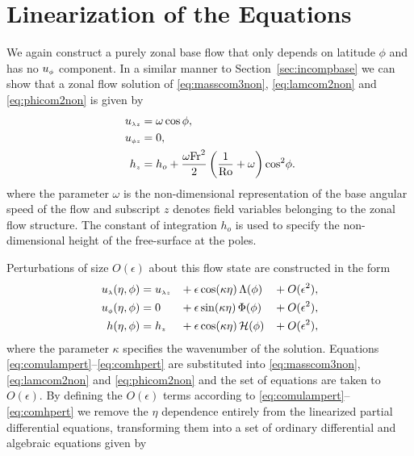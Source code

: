 \section{Linearization of the Equations}
We again construct a purely zonal base flow that only depends on latitude $\phi$ and has no ${u_{\scriptscriptstyle \phi}}$ component. In a similar manner to Section~\ref{sec:incompbase} we can show that a zonal flow solution of \eqref{eq:masscom3non}, \eqref{eq:lamcom2non} and \eqref{eq:phicom2non} is given by
\begin{align}
{\ensuremath{u_{\scriptscriptstyle \lambda z}}} &= \omega\cos\phi, \label{eqn:comzlam1}\\ 
{u_{\scriptscriptstyle \phi z}} &= 0, \label{eqn:comzphi1}\\
{h_{\scriptscriptstyle z}} &= h_o + \frac{\omega \mathrm{Fr}^2}{2}\left(\frac{1}{\mathrm{Ro}}+\omega \right)\cos^2\!\phi. \label{eqn:comzh1}
\end{align}
where the parameter $\omega$ is the non-dimensional representation of the base angular speed of the flow and subscript $z$ denotes field variables belonging to the zonal flow structure. The constant of integration $h_o$ is used to specify the non-dimensional height of the free-surface at the poles.

Perturbations of size $O(\epsilon)$ about this flow state are constructed in the form
\begin{alignat}{3}
{\ensuremath{u_{\scriptscriptstyle \lambda}}}(\eta,\phi) &= {u_{\scriptscriptstyle \lambda z}} &\!&+ \epsilon \cos(\kappa\eta)\,\Lambda(\phi) &\!&+ O(\epsilon^2), \label{eq:comulampert}\\
{u_{\scriptscriptstyle \phi}}(\eta,\phi) &= 0 &\!&+ \epsilon \sin(\kappa\eta)\,\Phi(\phi) &\!&+ O(\epsilon^2), \label{eq:comuphipert}\\
h(\eta,\phi) &= {h_{\scriptscriptstyle z}} &\!&+ \epsilon \cos(\kappa\eta)\,\mathcal{H}(\phi) &\!&+ O(\epsilon^2), \label{eq:comhpert}
\end{alignat}
where the parameter $\kappa$ specifies the wavenumber of the solution. Equations \eqref{eq:comulampert}--\eqref{eq:comhpert} are substituted into \eqref{eq:masscom3non}, \eqref{eq:lamcom2non} and \eqref{eq:phicom2non} and the set of equations are taken to $O(\epsilon)$. By defining the $O(\epsilon)$ terms according to \eqref{eq:comulampert}--\eqref{eq:comhpert} we remove the $\eta$ dependence entirely from the linearized partial differential equations, transforming them into a set of ordinary differential and algebraic equations given by

